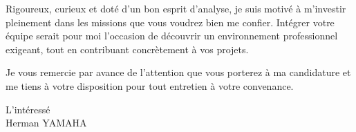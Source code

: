 \documentclass[
  13pt,
]{article}
\begin{document}
Rigoureux, curieux et doté d'un bon esprit d'analyse, je suis motivé à
m'investir pleinement dans les missions que vous voudrez bien me
confier. Intégrer votre équipe serait pour moi l'occasion de découvrir
un environnement professionnel exigeant, tout en contribuant
concrètement à vos projets.

Je vous remercie par avance de l'attention que vous porterez à ma
candidature et me tiens à votre disposition pour tout entretien à votre
convenance.

\begin{flushright}
L’intéressé\\
Herman YAMAHA
\end{flushright}
\end{document}
